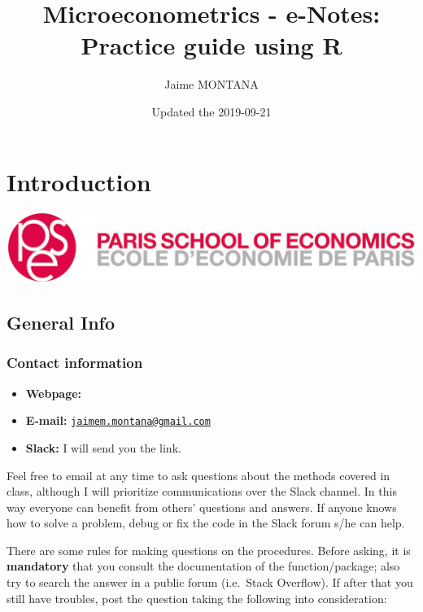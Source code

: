\documentclass[]{book}
\title{Microeconometrics - e-Notes: Practice guide using R}
\author{Jaime MONTANA}
\date{Updated the 2019-09-21}
\providecommand{\tightlist}{%
  \setlength{\itemsep}{0pt}\setlength{\parskip}{0pt}}
\begin{document}
\maketitle

{
\setcounter{tocdepth}{1}
\tableofcontents
}
\chapter{Introduction}\label{introduction}

\begin{center}\includegraphics[width=0.9\linewidth]{./images/1200px-Logo_pse_petit} \end{center}

\section{General Info}\label{general-info}

\subsection{Contact information}\label{contact-information}

\begin{itemize}
\tightlist
\item
  \textbf{Webpage:}
\item
  \textbf{E-mail:}
  \href{mailto:jaimem.montana@gmail.com}{\nolinkurl{jaimem.montana@gmail.com}}
\item
  \textbf{Slack:} I will send you the link.
\end{itemize}

Feel free to email at any time to ask questions about the methods
covered in class, although I will prioritize communications over the
Slack channel. In this way everyone can benefit from others' questions
and answers. If anyone knows how to solve a problem, debug or fix the
code in the Slack forum s/he can help.

There are some rules for making questions on the procedures. Before
asking, it is \textbf{mandatory} that you consult the documentation of
the function/package; also try to search the answer in a public forum
(i.e.~Stack Overflow). If after that you still have troubles, post the
question taking the following into consideration:
\end{document}
